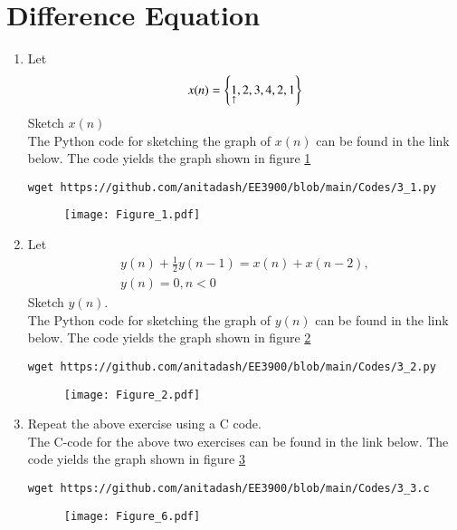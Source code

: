 \documentclass[journal,12pt,twocolumn]{IEEEtran}
\renewcommand\thesection{\arabic{section}}
\begin{document}
\section{Difference Equation}
\begin{enumerate}[label=\thesection.\arabic*,ref=\thesection.\theenumi]


\item Let
	\label{eq:x}
\begin{equation}
x(n) = \left\{\underset{\uparrow}{1},2,3,4,2,1\right\}
\end{equation}
Sketch $x(n)$
\\
\solution The Python code for sketching the graph of $x(n)$ can be found in the link below. The code yields the graph shown in figure \ref{fig:1}
\begin{lstlisting}
wget https://github.com/anitadash/EE3900/blob/main/Codes/3_1.py
\end{lstlisting}
\begin{figure}[!ht]
\begin{center}
\texttt{[image: Figure\_1.pdf]}
\end{center}
\label{fig:1}	
\end{figure}


\item Let
\begin{multline}
\label{eq:iir_filter}
y(n) + \frac{1}{2}y(n-1) = x(n) + x(n-2), 
\\
 y(n) = 0, n < 0
\end{multline}
Sketch $y(n)$.  
\\
\solution The Python code for sketching the graph of $y(n)$ can be found in the link below. The code yields the graph shown in figure \ref{fig:2}
\begin{lstlisting}
wget https://github.com/anitadash/EE3900/blob/main/Codes/3_2.py
\end{lstlisting}
\begin{figure}[!ht]
\begin{center}
\texttt{[image: Figure\_2.pdf]}
\end{center}
\label{fig:2}	
\end{figure}


\item Repeat the above exercise using a C code.
\\
\solution The C-code for the above two exercises can be found in the link below. The code yields the graph shown in figure \ref{fig:6}
\begin{lstlisting}
wget https://github.com/anitadash/EE3900/blob/main/Codes/3_3.c
\end{lstlisting}
\begin{figure}[!ht]
\begin{center}
\texttt{[image: Figure\_6.pdf]}
\end{center}
\label{fig:6}	
\end{figure}
\end{enumerate}
\end{document}
